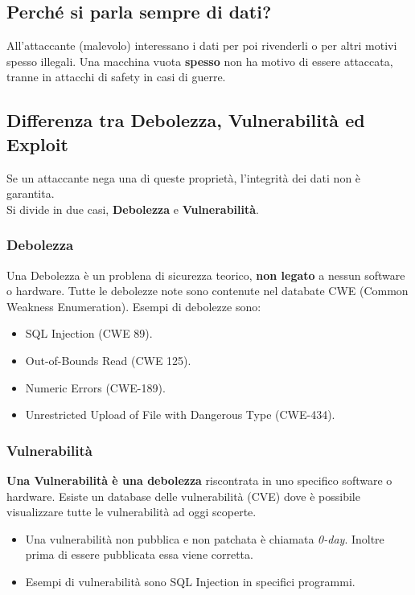 \documentclass{article}
\begin{document}
\subsection{Perché si parla sempre di dati?}
All'attaccante (malevolo) interessano i dati per poi rivenderli o per altri motivi spesso illegali. Una macchina vuota \textbf{spesso} non ha motivo di essere attaccata, tranne in attacchi di safety in casi di guerre.
\newpage
\subsection{Differenza tra Debolezza, Vulnerabilità ed Exploit}
Se un attaccante nega una di queste proprietà, l'integrità dei dati non è garantita.\\
Si divide in due casi, \textbf{Debolezza} e \textbf{Vulnerabilità}.

\subsubsection{Debolezza}
Una Debolezza è un problena di sicurezza teorico, \textbf{non legato} a nessun software o hardware. Tutte le debolezze note sono contenute nel databate CWE (Common Weakness Enumeration).
Esempi di debolezze sono:
\begin{itemize}
    \item SQL Injection (CWE 89).
    \item Out-of-Bounds Read (CWE 125).
    \item Numeric Errors (CWE-189).
    \item Unrestricted Upload of File with Dangerous Type (CWE-434).
\end{itemize}

\subsubsection{Vulnerabilità}
\textbf{Una Vulnerabilità è una debolezza} riscontrata in uno specifico software o hardware. Esiste un database delle vulnerabilità (CVE) dove è possibile visualizzare tutte le vulnerabilità ad oggi scoperte.
\begin{itemize}
    \item Una vulnerabilità non pubblica e non patchata è chiamata \textit{0-day}. Inoltre prima di essere pubblicata essa viene corretta.
    \item Esempi di vulnerabilità sono SQL Injection in specifici programmi.
\end{itemize}
\end{document}
